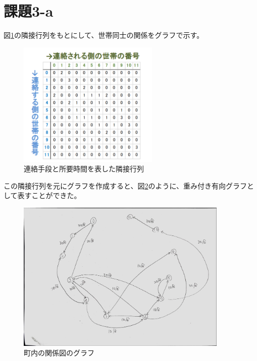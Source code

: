 \documentclass[a4paper,11pt]{bxjsarticle}
\begin{document}
    \maketitle

    \newpage

    \section{課題3-a}

    図\ref{fig:matrix}の隣接行列をもとにして、世帯同士の関係をグラフで示す。

    \begin{figure}[tbh]
        \begin{center}
            \includegraphics[width=0.6\textwidth]{matrix.png}
            \caption{連絡手段と所要時間を表した隣接行列}
            \label{fig:matrix}
        \end{center}        
    \end{figure}

    この隣接行列を元にグラフを作成すると、図\ref{fig:graph}のように、重み付き有向グラフとして表すことができた。

    \newpage

    \begin{figure}[tbh]
        \begin{center}
            \includegraphics[width=0.9\textwidth]{graph.jpg}
            \caption{町内の関係図のグラフ}
            \label{fig:graph}
        \end{center}        
    \end{figure}
\end{document}
